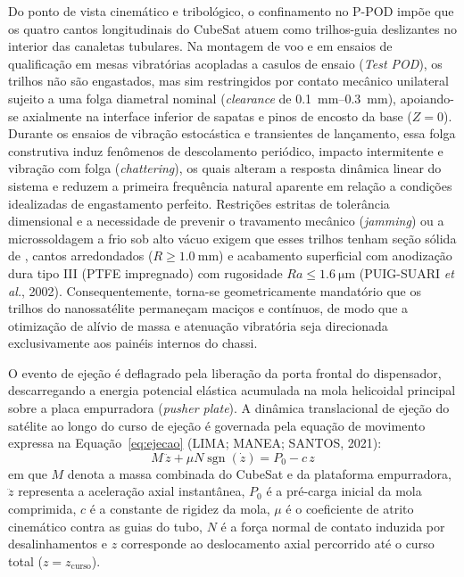 Do ponto de vista cinemático e tribológico, o confinamento no P-POD impõe que os quatro cantos longitudinais do CubeSat atuem como trilhos-guia deslizantes no interior das canaletas tubulares. Na montagem de voo e em ensaios de qualificação em mesas vibratórias acopladas a casulos de ensaio (\textit{Test POD}), os trilhos não são engastados, mas sim restringidos por contato mecânico unilateral sujeito a uma folga diametral nominal (\textit{clearance} de \SIrange{0.1}{0.3}{\milli\metre}), apoiando-se axialmente na interface inferior de sapatas e pinos de encosto da base ($Z = 0$). Durante os ensaios de vibração estocástica e transientes de lançamento, essa folga construtiva induz fenômenos de descolamento periódico, impacto intermitente e vibração com folga (\textit{chattering}), os quais alteram a resposta dinâmica linear do sistema e reduzem a primeira frequência natural aparente em relação a condições idealizadas de engastamento perfeito. Restrições estritas de tolerância dimensional e a necessidade de prevenir o travamento mecânico (\textit{jamming}) ou a microssoldagem a frio sob alto vácuo exigem que esses trilhos tenham seção sólida de \rail{}, cantos arredondados ($R \ge \SI{1.0}{\milli\metre}$) e acabamento superficial com anodização dura tipo III (PTFE impregnado) com rugosidade $Ra \le \SI{1.6}{\micro\metre}$ (PUIG-SUARI \textit{et al.}, 2002). Consequentemente, torna-se geometricamente mandatório que os trilhos do nanossatélite permaneçam maciços e contínuos, de modo que a otimização de alívio de massa e atenuação vibratória seja direcionada exclusivamente aos painéis internos do chassi.

O evento de ejeção é deflagrado pela liberação da porta frontal do dispensador, descarregando a energia potencial elástica acumulada na mola helicoidal principal sobre a placa empurradora (\textit{pusher plate}). A dinâmica translacional de ejeção do satélite ao longo do curso de ejeção é governada pela equação de movimento expressa na Equação~\eqref{eq:ejecao} (LIMA; MANEA; SANTOS, 2021):
\begin{equation}
  M\,\ddot{z} + \mu N \operatorname{sgn}(\dot{z}) = P_0 - c\,z
  \label{eq:ejecao}
\end{equation}
em que $M$ denota a massa combinada do CubeSat e da plataforma empurradora, $\ddot{z}$ representa a aceleração axial instantânea, $P_0$ é a pré-carga inicial da mola comprimida, $c$ é a constante de rigidez da mola, $\mu$ é o coeficiente de atrito cinemático contra as guias do tubo, $N$ é a força normal de contato induzida por desalinhamentos e $z$ corresponde ao deslocamento axial percorrido até o curso total ($z = z_{\text{curso}}$). 

